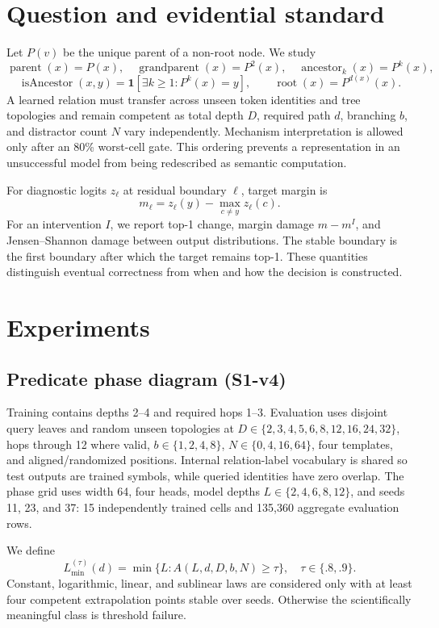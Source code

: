 \documentclass[10pt]{article}
\begin{document}
\section{Question and evidential standard}
Let $P(v)$ be the unique parent of a non-root node. We study
\[
 \operatorname{parent}(x)=P(x),\quad \operatorname{grandparent}(x)=P^2(x),\quad
 \operatorname{ancestor}_k(x)=P^k(x),
\]
\[
 \operatorname{isAncestor}(x,y)=\mathbf 1[\exists k\ge1:P^k(x)=y],\qquad
 \operatorname{root}(x)=P^{d(x)}(x).
\]
A learned relation must transfer across unseen token identities and tree topologies and remain competent as total depth $D$, required path $d$, branching $b$, and distractor count $N$ vary independently. Mechanism interpretation is allowed only after an 80\% worst-cell gate. This ordering prevents a representation in an unsuccessful model from being redescribed as semantic computation.

For diagnostic logits $z_\ell$ at residual boundary $\ell$, target margin is
\[m_\ell=z_\ell(y)-\max_{c\ne y}z_\ell(c).\]
For an intervention $I$, we report top-1 change, margin damage $m-m^I$, and Jensen--Shannon damage between output distributions. The stable boundary is the first boundary after which the target remains top-1. These quantities distinguish eventual correctness from when and how the decision is constructed.

\section{Experiments}
\subsection{Predicate phase diagram (S1-v4)}
Training contains depths 2--4 and required hops 1--3. Evaluation uses disjoint query leaves and random unseen topologies at $D\in\{2,3,4,5,6,8,12,16,24,32\}$, hops through 12 where valid, $b\in\{1,2,4,8\}$, $N\in\{0,4,16,64\}$, four templates, and aligned/randomized positions. Internal relation-label vocabulary is shared so test outputs are trained symbols, while queried identities have zero overlap. The phase grid uses width 64, four heads, model depths $L\in\{2,4,6,8,12\}$, and seeds 11, 23, and 37: 15 independently trained cells and 135,360 aggregate evaluation rows.

We define
\[L_{\min}^{(\tau)}(d)=\min\{L:A(L,d,D,b,N)\ge\tau\},\quad \tau\in\{.8,.9\}.
\]
Constant, logarithmic, linear, and sublinear laws are considered only with at least four competent extrapolation points stable over seeds. Otherwise the scientifically meaningful class is threshold failure.
\end{document}
